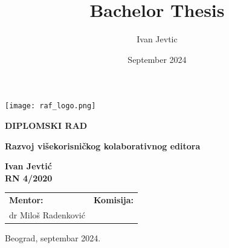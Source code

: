 \documentclass[12pt]{article}
\title{Bachelor Thesis}
\author{Ivan Jevtic}
\date{September 2024}
\begin{document}
\begin{titlepage}
	\begin{center}
		         
		\vspace*{-1in}
		\texttt{[image: raf\_logo.png]}
		
		\vspace{1in}
		\Large
		\textbf{DIPLOMSKI RAD}
		         
		\vspace{1in}
		\Huge
		\textbf{Razvoj višekorisničkog kolaborativnog editora}
		         
		\vspace{1in}
		
		
		\fontsize{14pt}{18pt}\selectfont
		\textbf{Ivan Jevtić} \\
		\textbf{RN 4/2020}
		\vspace*{1.5in}
		         
		\begin{center}
			\normalsize
			\begin{tabular}{p{} p{}}
				\fontsize{14pt}{18pt}\selectfont   
				\textbf{Mentor:}      &                       
				            
				\fontsize{14pt}{18pt}\selectfont
				\textbf{Komisija:} \\
				dr Miloš Radenković &  \\
				                                 
			\end{tabular}
		\end{center}
		
		\vspace*{\fill}
		
		\normalsize
		Beograd, septembar 2024.
		
		
		         
	\end{center}
\end{titlepage}
\restoregeometry %

\newpage
{} %
   
\renewcommand{\contentsname}{Sadržaj}
\tableofcontents
\thispagestyle{empty} %
\end{document}

